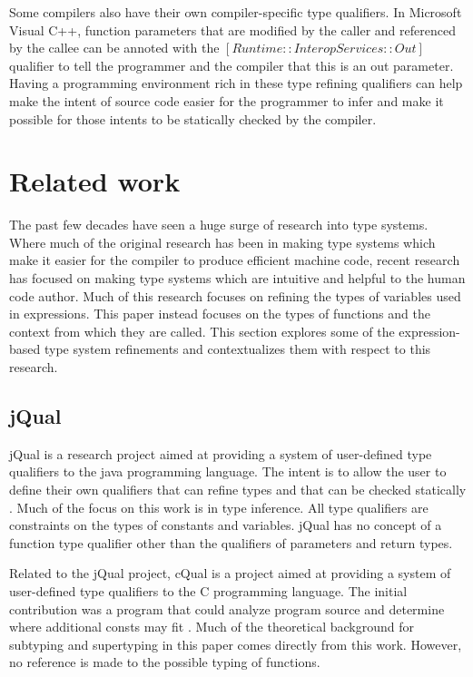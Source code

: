 \documentclass{article}
\begin{document}
  Some compilers also have their own compiler-specific type qualifiers.  In Microsoft Visual C++, function parameters that are modified by the caller and referenced by the callee can be annoted with the $[Runtime::InteropServices::Out]$ qualifier to tell the programmer and the compiler that this is an out parameter.  Having a programming environment rich in these type refining qualifiers can help make the intent of source code easier for the programmer to infer and make it possible for those intents to be statically checked by the compiler.  

  \section{Related work}
  
  The past few decades have seen a huge surge of research into type systems.  Where much of the original research has been in making type systems which make it easier for the compiler to produce efficient machine code, recent research has focused on making type systems which are intuitive and helpful to the human code author.  Much of this research focuses on refining the types of variables used in expressions.  This paper instead focuses on the types of functions and the context from which they are called.  This section explores some of the expression-based type system refinements and contextualizes them with respect to this research.

  \subsection{jQual}

  jQual is a research project aimed at providing a system of user-defined type qualifiers to the java programming language.  The intent is to allow the user to define their own qualifiers that can refine types and that can be checked statically \cite{jqual-inference, jqual-qualify}.  Much of the focus on this work is in type inference.  All type qualifiers are constraints on the types of constants and variables.  jQual has no concept of a function type qualifier other than the qualifiers of parameters and return types.  

  Related to the jQual project, cQual is a project aimed at providing a system of user-defined type qualifiers to the C programming language.  The initial contribution was a program that could analyze program source and determine where additional consts may fit \cite{theory-of-qual}.  Much of the theoretical background for subtyping and supertyping in this paper comes directly from this work.  However, no reference is made to the possible typing of functions.  
\end{document}
